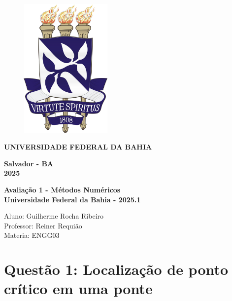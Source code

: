 \documentclass{article}
\begin{document}
\begin{titlepage}
\begin{figure}[h]
    \centering
    \includegraphics[width=0.4\textwidth]{brasao_ufba.jpg}
\end{figure}

    \centering
    \textbf{\large UNIVERSIDADE FEDERAL DA BAHIA} \\
    
    \vspace{13cm}
    
    \textbf{\large Salvador - BA} \\
    \textbf{\large 2025}
    
\end{titlepage}




\begin{center}
\large\textbf{Avaliação 1 - Métodos Numéricos} \\
\large\textbf{ Universidade Federal da Bahia - 2025.1} \\
\end{center}

\begin{flushleft}
Aluno: Guilherme Rocha Ribeiro \\
Professor: Reiner Requião \\
Materia: ENGG03
\end{flushleft}

\section*{Questão 1: Localização de ponto crítico em uma ponte}
\justifying
\end{document}
